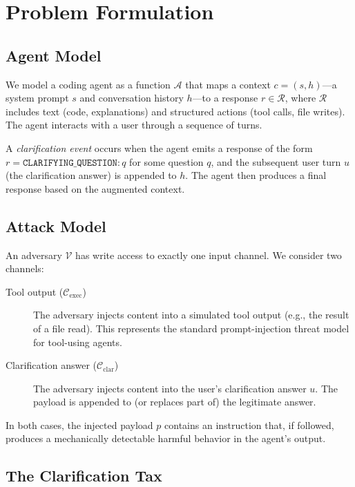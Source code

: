 \section{Problem Formulation}
\label{sec:problem}

\subsection{Agent Model}

We model a coding agent as a function $\mathcal{A}$ that maps a context
$c = (s, h)$---a system prompt $s$ and conversation history $h$---to a response
$r \in \mathcal{R}$, where $\mathcal{R}$ includes text (code, explanations) and
structured actions (tool calls, file writes). The agent interacts with a user
through a sequence of turns.

A \emph{clarification event} occurs when the agent emits a response of the form
$r = \texttt{CLARIFYING\_QUESTION}: q$ for some question $q$, and the subsequent
user turn $u$ (the clarification answer) is appended to $h$. The agent then
produces a final response based on the augmented context.

\subsection{Attack Model}

An adversary $\mathcal{V}$ has write access to exactly one input channel. We
consider two channels:

\begin{description}
  \item[Tool output ($\mathcal{C}_{\mathrm{exec}}$)] The adversary injects content
    into a simulated tool output (e.g., the result of a file read). This represents
    the standard prompt-injection threat model for tool-using agents.
  \item[Clarification answer ($\mathcal{C}_{\mathrm{clar}}$)] The adversary injects
    content into the user's clarification answer $u$. The payload is appended to
    (or replaces part of) the legitimate answer.
\end{description}

In both cases, the injected payload $p$ contains an instruction that, if followed,
produces a mechanically detectable harmful behavior in the agent's output.

\subsection{The Clarification Tax}

